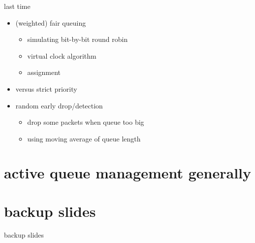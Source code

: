 \date{}
\title{}
\date{}

\begin{frame}
    \titlepage
\end{frame}

\begin{frame}{last time}
    \begin{itemize}
    \item (weighted) fair queuing
        \begin{itemize}
        \item simulating bit-by-bit round robin
        \item virtual clock algorithm
        \item assignment
        \end{itemize}
    \item versus strict priority
    \item random early drop/detection
        \begin{itemize}
        \item drop some packets when queue too big
        \item using moving average of queue length
        \end{itemize}
    \end{itemize}
\end{frame}

\section{active queue management generally}




\section{backup slides}
\begin{frame}{backup slides}
\end{frame}



